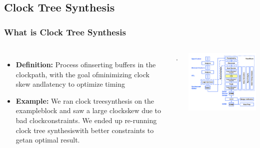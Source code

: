 \documentclass[compress]{beamer}
\begin{document}
\subsection[CTS]{Clock Tree Synthesis}
\begin{frame}
	\frametitle{What is Clock Tree Synthesis}
	\begin{columns}
		\begin{itemize}
			\item \textbf {Definition:} Process ofinserting buffers in the clockpath, with the goal ofminimizing clock skew andlatency to optimize timing
			\item \textbf {Example:} We ran clock treesynthesis on the exampleblock and saw a large clockskew due to bad clockconstraints.  We ended up re-running clock tree synthesiswith better constraints to getan optimal result.
		\end{itemize}.
		\begin{center}
			\includegraphics[width=\textwidth]{cts}
		\end{center}
	\end{columns}
\end{frame}
\end{document}

